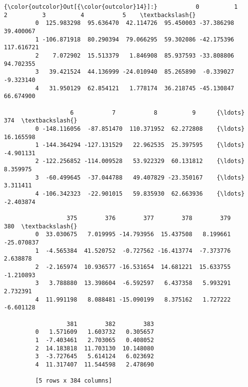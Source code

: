 \documentclass[11pt]{article}
\begin{document}
\begin{Verbatim}[commandchars=\\\{\}]
{\color{outcolor}Out[{\color{outcolor}14}]:}           0          1          2          3          4           5    \textbackslash{}
         0  125.983298  95.636470  42.114726  95.450003 -37.386298   39.400067   
         1 -106.871918  80.290394  79.066295  59.302086 -42.175396  117.616721   
         2    7.072902  15.513379   1.846908  85.937593 -33.808806   94.702355   
         3   39.421524  44.136999 -24.010940  85.265890  -0.339027   -9.323140   
         4   31.950129  62.854121   1.778174  36.218745 -45.130847   66.674900   
         
                   6           7           8          9      {\ldots}            374  \textbackslash{}
         0 -148.116056  -87.851470  110.371952  62.272808    {\ldots}      16.165598   
         1 -144.364294 -127.131529   22.962535  25.397595    {\ldots}      -4.901131   
         2 -122.256852 -114.009528   53.922329  60.131812    {\ldots}       8.359975   
         3  -60.499645  -37.044788   49.407829 -23.350167    {\ldots}       3.311411   
         4 -106.342323  -22.901015   59.835930  62.663936    {\ldots}      -2.403874   
         
                  375        376        377        378        379        380  \textbackslash{}
         0  33.030675   7.019995 -14.793956  15.437508   8.199661 -25.070837   
         1  -4.565384  41.520752  -0.727562 -16.413774  -7.373776   2.638878   
         2  -2.165974  10.936577 -16.531654  14.681221  15.633755  -1.210893   
         3   3.788880  13.398604  -6.592597   6.437358   5.993291   2.732391   
         4  11.991198   8.088481 -15.090199   8.375162   1.727222  -6.601128   
         
                  381        382        383  
         0   1.571609   1.603732   0.305657  
         1  -7.403461   2.703065   0.408052  
         2  14.183818  11.703130  10.148080  
         3  -3.727645   5.614124   6.023692  
         4  11.317407  11.544598   2.478690  
         
         [5 rows x 384 columns]
\end{Verbatim}
            
\end{document}

